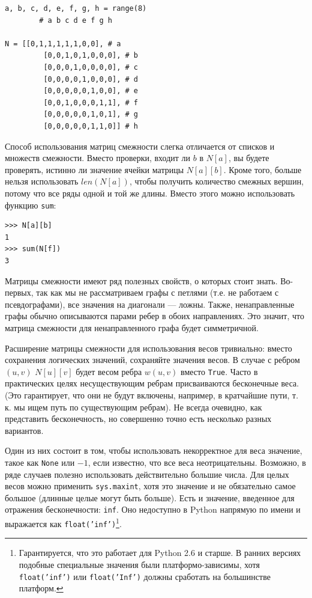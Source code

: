 \begin{lstlisting}[caption={Матрица смежности, реализованная с помощью вложенных списков},label={lst:adjacency}]
a, b, c, d, e, f, g, h = range(8)
	    # a b c d e f g h

N = [[0,1,1,1,1,1,0,0], # a
		 [0,0,1,0,1,0,0,0], # b
		 [0,0,0,1,0,0,0,0], # c
		 [0,0,0,0,1,0,0,0], # d
		 [0,0,0,0,0,1,0,0], # e
		 [0,0,1,0,0,0,1,1], # f
		 [0,0,0,0,0,1,0,1], # g
		 [0,0,0,0,0,1,1,0]] # h
\end{lstlisting}

Способ использования матриц смежности слегка отличается от списков и множеств смежности. Вместо проверки, входит ли $b$ в $N[a]$, вы будете проверять, истинно ли значение ячейки матрицы $N[a][b]$. Кроме того, больше нельзя использовать $len(N[a])$, чтобы получить количество смежных вершин, потому что все ряды одной и той же длины. Вместо этого можно использовать функцию \texttt{sum}:
\begin{lstlisting}
>>> N[a][b]
1
>>> sum(N[f])
3
\end{lstlisting}

Матрицы смежности имеют ряд полезных свойств, о которых стоит знать. Во-первых, так как мы не рассматриваем графы с петлями (т.е. не работаем с псевдографами), все значения на диагонали — ложны. Также, ненаправленные графы обычно описываются парами ребер в обоих направлениях. Это значит, что матрица смежности для ненаправленного графа будет симметричной.

Расширение матрицы смежности для использования весов тривиально: вместо сохранения логических значений, сохраняйте значения весов. В случае с ребром $(u, v)$ $N[u][v]$ будет весом ребра $w(u,v)$ вместо \texttt{True}. Часто в практических целях несуществующим ребрам присваиваются бесконечные веса. (Это гарантирует, что они не будут включены, например, в кратчайшие пути, т. к. мы ищем путь по существующим ребрам). Не всегда очевидно, как представить бесконечность, но совершенно точно есть несколько разных вариантов.

Один из них состоит в том, чтобы использовать некорректное для веса значение, такое как \texttt{None} или $-1$, если известно, что все веса неотрицательны. Возможно, в ряде случаев полезно использовать действительно большие числа. Для целых весов можно применить \texttt{sys.maxint}, хотя это значение и не обязательно самое большое (длинные целые могут быть больше). Есть и значение, введенное для отражения бесконечности: \texttt{inf}. Оно недоступно в Python напрямую по имени и выражается как \texttt{float('inf')}\footnote{Гарантируется, что это работает для Python 2.6 и старше. В ранних версиях подобные специальные значения были платформо-зависимы, хотя \texttt{float('inf')} или \texttt{float('Inf')} должны сработать на большинстве платформ.}.


